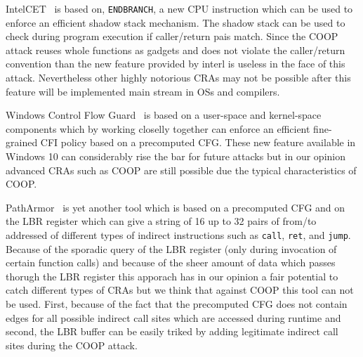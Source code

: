 IntelCET~\cite{intel:cet} is based on, \texttt{ENDBRANCH}, a new CPU instruction which can be used to enforce
an efficient shadow stack mechanism. The shadow stack can be used to check during program execution if caller/return pais match.
Since the COOP attack reuses whole functions as gadgets and does not violate the caller/return convention than the 
new feature provided by interl is useless in the face of this attack. Nevertheless other highly notorious CRAs may not be possible
after this feature will be implemented main stream in OSs and compilers.

Windows Control Flow Guard~\cite{windows:cfguard} is based on a user-space and kernel-space components which
by working closelly together can enforce an efficient fine-grained CFI policy based on a precomputed CFG.
These new feature available in Windows 10 can considerably rise the bar for future attacks but in our opinion advanced CRAs
such as COOP are still possible due the typical characteristics of COOP.

PathArmor~\cite{veen:cfi} is yet another tool which is based on a precomputed CFG and on the LBR register which can give a string of 16 up to
32 pairs of from/to addressed of different types of indirect instructions such as \texttt{call}, \texttt{ret}, and \texttt{jump}. 
Because of the sporadic query of the LBR register (only during invocation of certain function calls) and because of the sheer amount of 
data which passes thorugh the LBR register this apporach has in our opinion a fair potential to catch different types of CRAs but
we think that against COOP this tool can not be used. First, because of the fact that the precomputed CFG does not contain edges for all
possible indirect call sites which are accessed during runtime and second, the LBR buffer can be easily triked by adding
legitimate indirect call sites  during the COOP attack.

